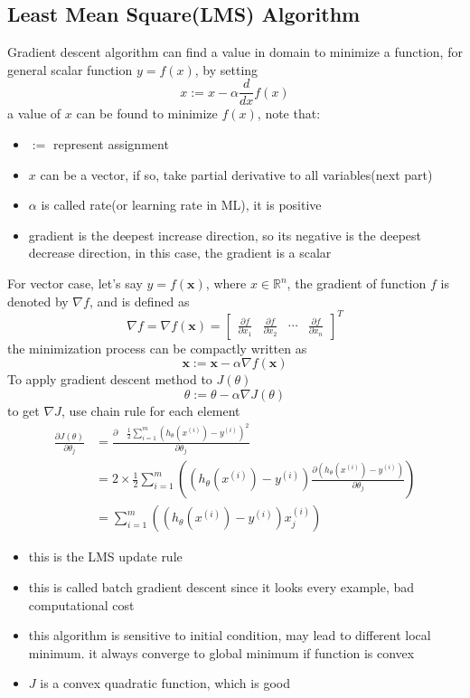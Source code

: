 \documentclass[10pt,a4paper,oneside]{article}
\begin{document}
\subsection{Least Mean Square(LMS) Algorithm}
Gradient descent algorithm can find a value in domain to minimize a function, for general scalar function $y = f(x)$, by setting
\[
x := x - \alpha \frac{d}{dx}f(x)
\]
a value of $x$ can be found to minimize $f(x)$, note that:
\begin{itemize}
	\item $:=$ represent assignment
	\item $x$ can be a vector, if so, take partial derivative to all variables(next part)
	\item $\alpha$ is called rate(or learning rate in ML), it is positive
	\item gradient is the deepest increase direction, so its negative is the deepest decrease direction, in this case, the gradient is a scalar
\end{itemize}
For vector case, let's say $y = f(\textbf{x})$, where $x \in \mathbb{R}^n$, the gradient of function $f$ is denoted by $\nabla f$, and is defined as
\[
\nabla f = \nabla f(\textbf{x}) = \begin{bmatrix}
\frac{\partial f}{\partial x_1} & \frac{\partial f}{\partial x_2} & \cdots &  \frac{\partial f}{\partial x_n}
\end{bmatrix}^T
\]
the minimization process can be compactly written as
\[
\textbf{x} := \textbf{x} - \alpha \nabla f(\textbf{x})
\]
To apply gradient descent method to $J(\theta)$
\[
\theta := \theta - \alpha \nabla J(\theta)
\]
to get $\nabla J$, use chain rule for each element
\begin{align*}
\frac{\partial J(\theta)}{\partial \theta_j} &= \frac{\partial \quad  \frac{1}{2} \sum_{i=1}^{m} (h_\theta(x^{(i)}) - y^{(i)})^2}{\partial \theta_j}\\
&= 2 \times \frac{1}{2}  \sum_{i=1}^{m} \left((h_\theta(x^{(i)}) - y^{(i)}) \frac{\partial (h_\theta(x^{(i)}) - y^{(i)})}{\partial \theta_j}  \right)\\
&= \sum_{i=1}^{m} \left((h_\theta(x^{(i)}) - y^{(i)}) x_j^{(i)}  \right)
\end{align*}
\begin{itemize}
	\item this is the LMS update rule
	\item this is called batch gradient descent since it looks every example, bad computational cost
	\item this algorithm is sensitive to initial condition, may lead to different local minimum. it always converge to global minimum if function is convex
	\item $J$ is a convex quadratic function, which is good
\end{itemize}
\end{document}
